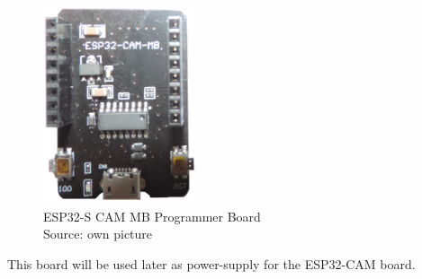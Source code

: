 \begin{figure}[H]
\centering
\includegraphics[width=0.4\textwidth]{ESP32-CAM-MB-programmer}
\caption[ESP32-S-CAM]{ESP32-S CAM MB Programmer Board \\ Source: own picture}
\label{ESP32-S-CAM-overview}
\end{figure}

This board will be used later as power-supply for the ESP32-CAM board.

